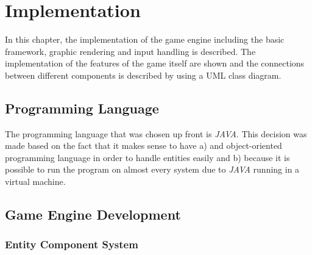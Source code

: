 \section{Implementation}\label{sec:implementation}
In this chapter, the implementation of the game engine including the basic framework, graphic rendering and input handling is described.
The implementation of the features of the game itself are shown and the connections between different components is described by using a
UML class diagram.
\subsection{Programming Language}\label{subsec:programming-language}
The programming language that was chosen up front is \textit{JAVA}.
This decision was made based on the fact that it makes sense to have a) and object-oriented programming language in order to
handle entities easily and b) because it is possible to run the program on almost every system due to \textit{JAVA} running
in a virtual machine.
\subsection{Game Engine Development}\label{subsec:game-engine-development}
\subsubsection{Entity Component System}
